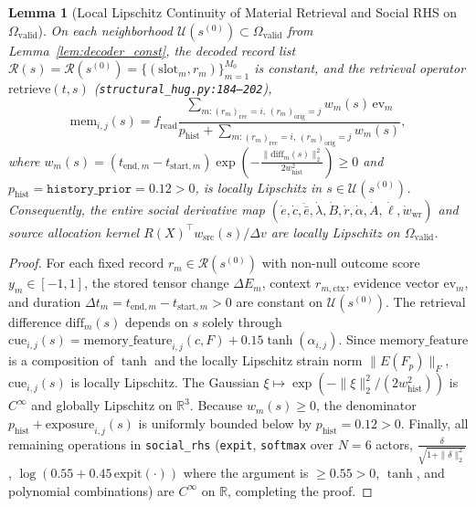 \documentclass[11pt,a4paper]{article}
\newtheorem{lemma}[theorem]{Lemma}
\theoremstyle{definition}
\begin{document}
\begin{lemma}[Local Lipschitz Continuity of Material Retrieval and Social RHS on $\Omega_{\mathrm{valid}}$]
\label{lem:social_lipschitz}
On each neighborhood $\mathcal{U}(s^{(0)}) \subset \Omega_{\mathrm{valid}}$ from Lemma~\ref{lem:decoder_const}, the decoded record list $\mathcal{R}(s) = \mathcal{R}(s^{(0)}) = \{(\mathrm{slot}_m, r_m)\}_{m=1}^{M_0}$ is constant, and the retrieval operator $\mathrm{retrieve}(t, s)$ (\texttt{structural\_hug.py:184--202}),
\begin{equation}
  \mathrm{mem}_{i,j}(s) = f_{\mathrm{read}}\frac{\sum_{m : (r_m)_{\mathrm{rec}}=i,\, (r_m)_{\mathrm{orig}}=j} w_m(s)\, \mathrm{ev}_m}{p_{\mathrm{hist}} + \sum_{m : (r_m)_{\mathrm{rec}}=i,\, (r_m)_{\mathrm{orig}}=j} w_m(s)},
\end{equation}
where $w_m(s) = (t_{\mathrm{end},m} - t_{\mathrm{start},m})\exp\!\left(-\frac{\|\mathrm{diff}_m(s)\|_2^2}{2 w_{\mathrm{hist}}^2}\right) \ge 0$ and $p_{\mathrm{hist}} = \texttt{history\_prior} = 0.12 > 0$, is locally Lipschitz in $s \in \mathcal{U}(s^{(0)})$. Consequently, the entire social derivative map $(\dot{e}, \dot{c}, \dot{\bar{e}}, \dot{\lambda}, \dot{B}, \dot{r}, \dot{\alpha}, \dot{A}, \dot{\ell}, \dot{w}_{\mathrm{wr}})$ and source allocation kernel $R(X)^\top w_{\mathrm{src}}(s)/\Delta v$ are locally Lipschitz on $\Omega_{\mathrm{valid}}$.
\end{lemma}

\begin{proof}
For each fixed record $r_m \in \mathcal{R}(s^{(0)})$ with non-null outcome score $y_m \in [-1, 1]$, the stored tensor change $\Delta E_m$, context $r_{m,\mathrm{ctx}}$, evidence vector $\mathrm{ev}_m$, and duration $\Delta t_m = t_{\mathrm{end},m} - t_{\mathrm{start},m} > 0$ are constant on $\mathcal{U}(s^{(0)})$. The retrieval difference $\mathrm{diff}_m(s)$ depends on $s$ solely through $\mathrm{cue}_{i,j}(s) = \mathrm{memory\_feature}_{i,j}(c, F) + 0.15\tanh(\alpha_{i,j})$. Since $\mathrm{memory\_feature}$ is a composition of $\tanh$ and the locally Lipschitz strain norm $\|E(F_p)\|_F$, $\mathrm{cue}_{i,j}(s)$ is locally Lipschitz. The Gaussian $\xi \mapsto \exp(-\|\xi\|_2^2/(2 w_{\mathrm{hist}}^2))$ is $C^\infty$ and globally Lipschitz on $\mathbb{R}^3$. Because $w_m(s) \ge 0$, the denominator $p_{\mathrm{hist}} + \mathrm{exposure}_{i,j}(s)$ is uniformly bounded below by $p_{\mathrm{hist}} = 0.12 > 0$. Finally, all remaining operations in \texttt{social\_rhs} (\texttt{expit}, \texttt{softmax} over $N=6$ actors, $\frac{\delta}{\sqrt{1+\|\delta\|_2^2}}$, $\log(0.55 + 0.45\,\mathrm{expit}(\cdot))$ where the argument is $\ge 0.55 > 0$, $\tanh$, and polynomial combinations) are $C^\infty$ on $\mathbb{R}$, completing the proof.
\end{proof}
\end{document}
